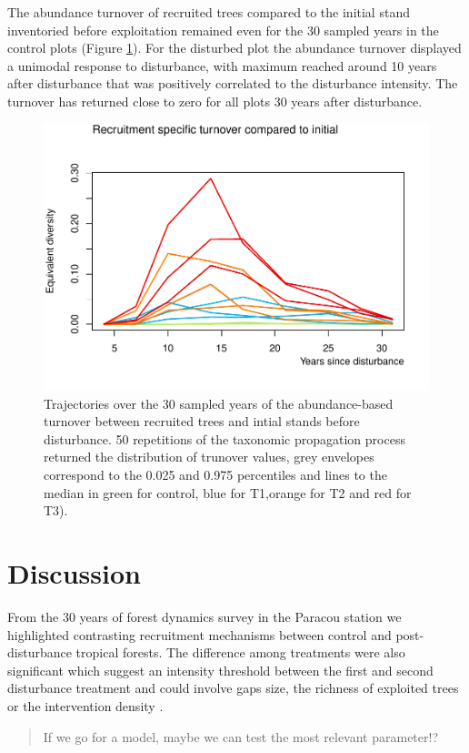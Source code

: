 \documentclass[fleqn,10pt]{ArtEcoFoG} %
\begin{document}
The abundance turnover of recruited trees compared to the initial stand
inventoried before exploitation remained even for the 30 sampled years
in the control plots (Figure \ref{fig:Fig6}). For the disturbed plot the
abundance turnover displayed a unimodal response to disturbance, with
maximum reached around 10 years after disturbance that was positively
correlated to the disturbance intensity. The turnover has returned close
to zero for all plots 30 years after disturbance.

\begin{figure}

{\centering \includegraphics[width=0.5\linewidth]{RecruitmentTrajectories_files/figure-latex/Fig6-1} 

}

\caption{Trajectories over the 30 sampled years of the abundance-based turnover between recruited trees and intial stands before disturbance. 50 repetitions of the taxonomic propagation process returned the distribution of trunover values, grey envelopes correspond to the 0.025 and 0.975 percentiles and lines to the median in green for control, blue for T1,orange for T2 and red for T3).}\label{fig:Fig6}
\end{figure}

\section{Discussion}\label{discussion}

From the 30 years of forest dynamics survey in the Paracou station we
highlighted contrasting recruitment mechanisms between control and
post-disturbance tropical forests. The difference among treatments were
also significant which suggest an intensity threshold between the first
and second disturbance treatment and could involve gaps size, the
richness of exploited trees or the intervention density
\citep{Denslow1980}.

\begin{quote}
If we go for a model, maybe we can test the most relevant parameter!?
\end{quote}
\end{document}
